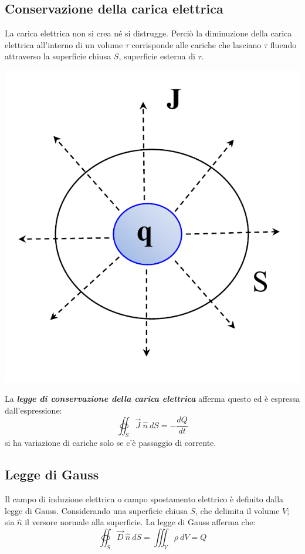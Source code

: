 \documentclass{article}
\begin{document}
\subsection{Conservazione della carica elettrica}
La carica elettrica non si crea né si distrugge. Perciò la diminuzione della carica elettrica
all'interno di un volume $\tau$ corrisponde alle
cariche che lasciano $\tau$ fluendo attraverso la
superficie chiusa $S$, superficie esterna di $\tau$.
\begin{center}
    \includegraphics[scale=0.3]{Image/Conservazione della carica.png}
\end{center}
La \textbf{\textit{
legge di conservazione della carica elettrica}} afferma questo ed è espressa
dall'espressione: 
\[
    \oiint_{S} \vec J \ \hat n \ dS = - \frac{dQ}{dt}
\]
si ha variazione di cariche solo se c'è passaggio di corrente.




\subsection{Legge di Gauss}
Il campo di induzione elettrica o campo spostamento elettrico è definito dalla
legge di Gauss.
Considerando una superficie chiusa $S$,
che delimita il volume $V$; sia $\hat n$ il versore
normale alla superficie. La legge di Gauss
afferma che:
\[
    \oiint_{S} \vec D \ \hat n \ dS = \iiint_{V}\rho \ dV = Q
\]
\end{document}
